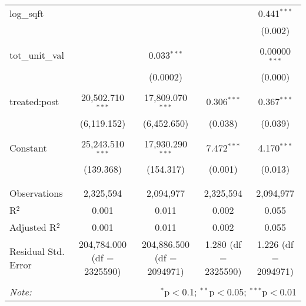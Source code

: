 \begin{table}[H]
{\begin{tabular}{@{\extracolsep{5pt}}lcccc}
  log\_sqft &  &  &  & 0.441$^{***}$ \\  

   &  &  &  & (0.002) \\  

   & & & & \\  

  tot\_unit\_val &  & 0.033$^{***}$ &  & 0.00000$^{***}$ \\  

   &  & (0.0002) &  & (0.000) \\  

   & & & & \\  

  treated:post & 20,502.710$^{***}$ & 17,809.070$^{***}$ & 0.306$^{***}$ & 0.367$^{***}$ \\  

   & (6,119.152) & (6,452.650) & (0.038) & (0.039) \\  

   & & & & \\  

  Constant & 25,243.510$^{***}$ & 17,930.290$^{***}$ & 7.472$^{***}$ & 4.170$^{***}$ \\  

   & (139.368) & (154.317) & (0.001) & (0.013) \\  

   & & & & \\  

 \hline \\[-1.8ex]  

 Observations & 2,325,594 & 2,094,977 & 2,325,594 & 2,094,977 \\  

 R$^{2}$ & 0.001 & 0.011 & 0.002 & 0.055 \\  

 Adjusted R$^{2}$ & 0.001 & 0.011 & 0.002 & 0.055 \\  

 Residual Std. Error & 204,784.000 (df = 2325590) & 204,886.500 (df = 2094971) & 1.280 (df = 2325590) & 1.226 (df = 2094971) \\  

 \hline  

 \hline \\[-1.8ex]  

 \textit{Note:}  & \multicolumn{4}{r}{$^{*}$p$<$0.1; $^{**}$p$<$0.05; $^{***}$p$<$0.01} \\  

 \end{tabular}}  

 \end{table}  

